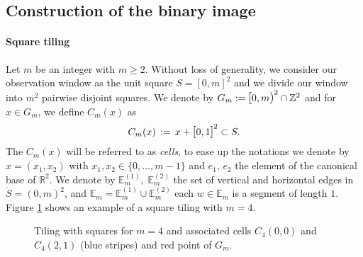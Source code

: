 \documentclass[12pt]{article}
\theoremstyle{Theorem}
\begin{document}
\subsection{Construction of the binary image}\label{construction}
\paragraph{Square tiling}
Let $m$ be an integer with $m \geq 2$. Without loss of generality, we consider our observation window as the unit square $S = [0,m]^{2}$ and  we divide our window into $m^{2}$ pairwise disjoint squares. We denote by $G_{m} := \text{\larger[1]{$[$}}0, m \text{\larger[1]{$)$}}^{2} \cap \mathbb{Z}^{2} $ and for $x \in G_{m}$, we define $C_{m}(x)$ as
\begin{equation*}
C_{m}(x) \, := \,x + \text{\larger[1]{$[$}}0, 1 \text{\larger[1]{$]$}}^{2} \subset S.
\end{equation*}
The $C_{m}(x)$ will be referred to as \textit{cells}, to ease up the notations we denote by $x = (x_1, x_2)$ with $x_1, x_2 \in \{0,\ldots, m-1\}$ and $e_1$, $e_{2}$ the element of the canonical base of $\mathbb{R}^{2}$.
We denote by $\mathbb{E}^{(1)}_{m}, \; \mathbb{E}^{(2)}_{m} $ the set of vertical and horizontal edges in $\mathring{S} = (0,m)^{2}$, and $\mathbb{E}_{m} = \mathbb{E}^{(1)}_{m} \cup \mathbb{E}^{(2)}_{m}$ each $w \in \mathbb{E}_{m}$ is a segment of length $1$.
Figure \ref{fig1} shows an example of a square tiling with $m = 4$.
\begin{figure}[h]
\begin{center}
\end{center}
\vspace{-0.25cm}
\caption{Tiling with squares for $m = 4$ and associated cells $C_{4}(0,0)$ and $C_{4}(2,1)$ (blue stripes) and red point of $G_{m}$.}
\label{fig1}
\end{figure}
\end{document}
